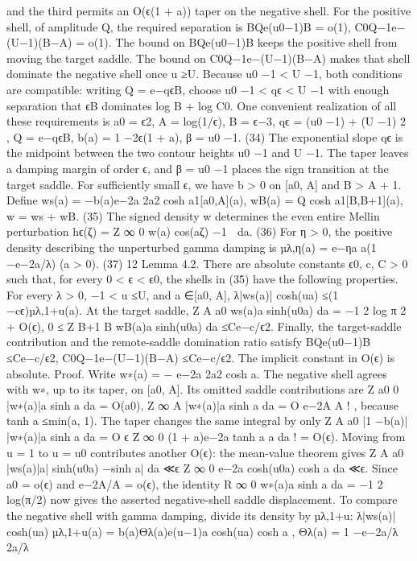 and the third permits an O(ϵ(1 + a)) taper on the negative shell. For the positive shell, of
amplitude Q, the required separation is
BQe(u0−1)B = o(1),
C0Q−1e−(U−1)(B−A) = o(1).
The bound on BQe(u0−1)B keeps the positive shell from moving the target saddle. The bound
on C0Q−1e−(U−1)(B−A) makes that shell dominate the negative shell once u ≥U.
Because
u0 −1 < U −1, both conditions are compatible: writing Q = e−qϵB, choose u0 −1 < qϵ < U −1
with enough separation that ϵB dominates log B + log C0.
One convenient realization of all these requirements is
a0 = ϵ2,
A = log(1/ϵ),
B = ϵ−3,
qϵ = (u0 −1) + (U −1)
2
,
Q = e−qϵB,
b(a) = 1 −2ϵ(1 + a),
β = u0 −1.
(34)
The exponential slope qϵ is the midpoint between the two contour heights u0 −1 and U −1.
The taper leaves a damping margin of order ϵ, and β = u0 −1 places the sign transition at the
target saddle. For suﬃciently small ϵ, we have b > 0 on [a0, A] and B > A + 1. Deﬁne
ws(a) = −b(a)e−2a
2a2 cosh a1[a0,A](a),
wB(a) =
Q
cosh a1[B,B+1](a),
w = ws + wB.
(35)
The signed density w determines the even entire Mellin perturbation
hϵ(ζ) =
Z ∞
0
w(a)
 cos(aζ) −1
 da.
(36)
For η > 0, the positive density describing the unperturbed gamma damping is
µλ,η(a) =
e−ηa
a(1 −e−2a/λ)
(a > 0).
(37)
12
Lemma 4.2. There are absolute constants ϵ0, c, C > 0 such that, for every 0 < ϵ < ϵ0, the
shells in (35) have the following properties. For every λ > 0, −1 < u ≤U, and a ∈[a0, A],
λ|ws(a)| cosh(ua) ≤(1 −cϵ)µλ,1+u(a).
At the target saddle,
Z A
a0
ws(a)a sinh(u0a) da = −1
2 log π
2 + O(ϵ),
0 ≤
Z B+1
B
wB(a)a sinh(u0a) da ≤Ce−c/ϵ2.
Finally, the target-saddle contribution and the remote-saddle domination ratio satisfy
BQe(u0−1)B ≤Ce−c/ϵ2,
C0Q−1e−(U−1)(B−A) ≤Ce−c/ϵ2.
The implicit constant in O(ϵ) is absolute.
Proof. Write
w∗(a) = −
e−2a
2a2 cosh a.
The negative shell agrees with w∗, up to its taper, on [a0, A]. Its omitted saddle contributions
are
Z a0
0
|w∗(a)|a sinh a da = O(a0),
Z ∞
A
|w∗(a)|a sinh a da = O
e−2A
A
!
,
because tanh a ≤min(a, 1). The taper changes the same integral by only
Z A
a0
|1 −b(a)| |w∗(a)|a sinh a da = O
ϵ
Z ∞
0
(1 + a)e−2a tanh a
a
da
!
= O(ϵ).
Moving from u = 1 to u = u0 contributes another O(ϵ): the mean-value theorem gives
Z A
a0
|ws(a)|a| sinh(u0a) −sinh a| da ≪ϵ
Z ∞
0
e−2a cosh(u0a)
cosh a
da ≪ϵ.
Since a0 = o(ϵ) and e−2A/A = o(ϵ), the identity
R ∞
0 w∗(a)a sinh a da = −1
2 log(π/2) now gives
the asserted negative-shell saddle displacement.
To compare the negative shell with gamma damping, divide its density by µλ,1+u:
λ|ws(a)| cosh(ua)
µλ,1+u(a)
= b(a)Θλ(a)e(u−1)a cosh(ua)
cosh a ,
Θλ(a) = 1 −e−2a/λ
2a/λ
